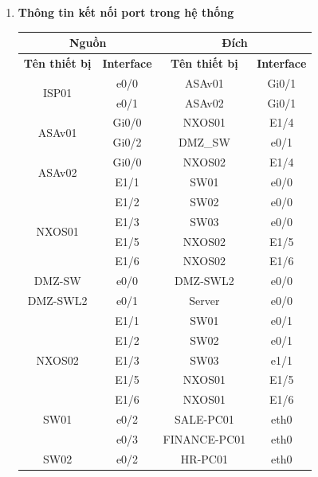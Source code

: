 \documentclass[13pt]{article}
\begin{document}
\begin{enumerate}
\newpage
\item \textbf{Thông tin kết nối port trong hệ thống}
\begin{table}[h!]
    \centering
    \begin{tabular}{|c|c|c|c|}
        \hline
        \multicolumn{2}{|c|}{\textbf{Nguồn}} & \multicolumn{2}{c|}{\textbf{Đích}} \\ \hline
        \textbf{Tên thiết bị} & \textbf{Interface} & \textbf{Tên thiết bị} & \textbf{Interface} \\ \hline
        \multirow{2}{*}{ISP01} & e0/0 & ASAv01 & Gi0/1 \\ \cline{2-4}
                               & e0/1 & ASAv02 & Gi0/1 \\ \hline
        \multirow{2}{*}{ASAv01} & Gi0/0 & NXOS01 & E1/4 \\ \cline{2-4}
                                & Gi0/2 & DMZ\_SW & e0/1 \\ \hline
        \multirow{2}{*}{ASAv02} & Gi0/0 & NXOS02 & E1/4 \\ \cline{2-4}
                                & E1/1 & SW01 & e0/0 \\ \hline
        \multirow{4}{*}{NXOS01} & E1/2 & SW02 & e0/0 \\ \cline{2-4}
                                & E1/3 & SW03 & e0/0 \\ \cline{2-4}
                                & E1/5 & NXOS02 & E1/5 \\ \cline{2-4}
                                & E1/6 & NXOS02 & E1/6 \\ \hline
        DMZ-SW & e0/0 & DMZ-SWL2 & e0/0\\
        \hline
        DMZ-SWL2 & e0/1 & Server & e0/0\\
        \hline
        \multirow{5}{*}{NXOS02} & E1/1 & SW01 & e0/1 \\ \cline{2-4}
                                & E1/2 & SW02 & e0/1 \\ \cline{2-4}
                                & E1/3 & SW03 & e1/1 \\ \cline{2-4}
                                & E1/5 & NXOS01 & E1/5 \\ \cline{2-4}
                                & E1/6 & NXOS01 & E1/6 \\ \hline
        SW01 & e0/2 & SALE-PC01 & eth0\\
        \hline
         & e0/3 & FINANCE-PC01 & eth0\\
        \hline
        SW02 & e0/2 & HR-PC01 & eth0\\

\end{tabular}
\end{table}
\end{enumerate}
\end{document}
